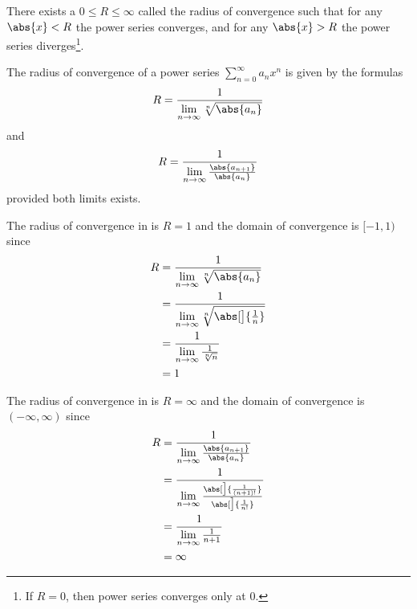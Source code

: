 \begin{thm}\label{thm-radius-of-convergence}
	There exists a $0 \leq R \leq \infty$ called the radius of convergence such that for
	any $\abs{x}<R$ the power series converges, and for any $\abs{x}>R$ the power
	series diverges\footnote{If $R=0$, then power series converges only at $0$.}.
\end{thm}

\begin{thm}\label{thm-radius-of-convergence-formula}
	The radius of convergence of a power series $\sum_{n=0}^\infty a_n x^n$ is
	given by the formulas
	\begin{equation}\label{eq-radius-of-convergence-formula:1}
		R=\frac{1}{\lim\limits_{n\to\infty}\sqrt[n]{\abs{a_n}}}
	\end{equation}
	and
	\begin{equation}\label{eq-radius-of-convergence-formula:2}
		R=\frac{1}{\lim\limits_{n\to\infty}\frac{\abs{a_{n+1}}}{\abs{a_n}}}
	\end{equation}
	provided both limits exists.
\end{thm}

\begin{exm}\label{exm-radius-of-convergence:1}
	The radius of convergence in  is $R=1$ and
	the domain of convergence is $[-1,1)$ since
	\begin{align*}
		R & = \frac{1}{\lim\limits_{n\to\infty}\sqrt[n]{\abs{a_n}}}               \\
		  & = \frac{1}{\lim\limits_{n\to\infty}\sqrt[n]{\abs[\big]{\frac{1}{n}}}} \\
		  & = \frac{1}{\lim\limits_{n\to\infty}\frac{1}{\sqrt[n]{n}}}             \\
		  & = 1
	\end{align*}
\end{exm}

\begin{exm}\label{exm-radius-of-convergence:2}
	The radius of convergence in  is $R=\infty$ and
	the domain of convergence is $(-\infty,\infty)$ since
	\begin{align*}
		R & = \frac{1}{\lim\limits_{n\to\infty}\frac{\abs{a_{n+1}}}{\abs{a_n}}}                               \\
		  & = \frac{1}{\lim\limits_{n\to\infty}\frac{\abs[\big]{\frac{1}{(n+1)!}}}{\abs[\big]{\frac{1}{n!}}}} \\
		  & = \frac{1}{\lim\limits_{n\to\infty}\frac{1}{n+1}}                                                 \\
		  & = \infty
	\end{align*}
\end{exm}


